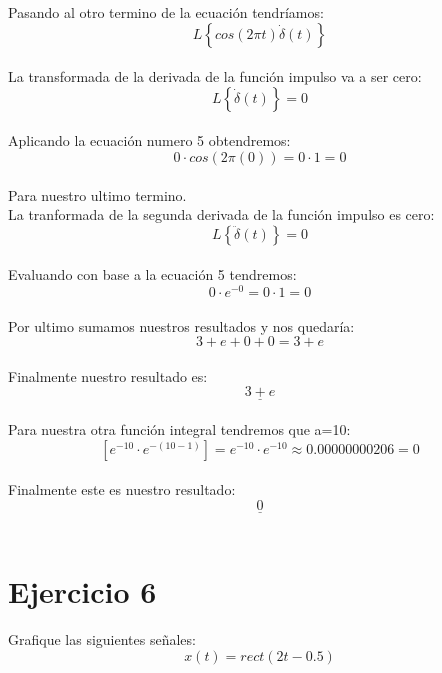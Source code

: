 \documentclass[10pt,a4paper]{report}
\begin{document}
Pasando al otro termino de la ecuación tendríamos:
\begin{equation}
L\left \{ cos(2\pi t)\dot{\delta }(t) \right \}
\end{equation}\\
La transformada de la derivada de la función impulso va a ser cero:
\begin{equation}
L\left \{ \dot{\delta }(t) \right \}=0
\end{equation}\\
Aplicando la ecuación numero 5 obtendremos:
\begin{equation}
0\cdot cos(2\pi (0))=0\cdot 1=0
\end{equation}\\
Para nuestro ultimo termino.\\
La tranformada de la segunda derivada de la función impulso es cero:
\begin{equation}
L\left \{ \ddot{\delta }(t) \right \}=0
\end{equation}\\
Evaluando con base a la ecuación 5 tendremos:
\begin{equation}
0\cdot e^{-0}=0\cdot 1=0
\end{equation}\\
Por ultimo sumamos nuestros resultados y nos quedaría:
\begin{equation}
3+e+0+0=3+e
\end{equation}\\
Finalmente nuestro resultado es:
\begin{equation}
\underline{3+e}
\end{equation}\\

Para nuestra otra función integral tendremos que a=10:
\begin{equation}
\left [ e^{-10}\cdot e^{-(10-1)} \right ]=e^{-10}\cdot e^{-10}\approx 0.00000000206= 0
\end{equation}\\
Finalmente este es nuestro resultado:
\begin{equation}
\underline{0}
\end{equation}\\







\section{Ejercicio 6}
Grafique las siguientes señales:
\begin{equation*}
x(t)=rect(2t-0.5)
\end{equation*}
\end{document}
